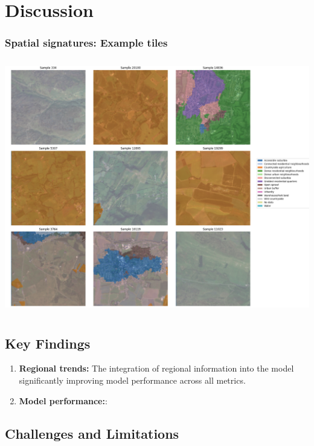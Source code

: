 \documentclass[
  letterpaper,
  DIV=11,
  numbers=noendperiod]{scrartcl}
\begin{document}
\section{Discussion}\label{discussion}

\subsubsection{Spatial signatures: Example
tiles}\label{spatial-signatures-example-tiles}

\begin{center}
\includegraphics[width=\textwidth,height=4.375in]{../figures/algo_design/random_sample.png}
\end{center}

\subsection{Key Findings}\label{key-findings}

\begin{enumerate}
\def\labelenumi{\arabic{enumi}.}
\item
  \textbf{Regional trends:} The integration of regional information into
  the model significantly improving model performance across all
  metrics.
\item
  \textbf{Model performance:}:
\end{enumerate}

\subsection{Challenges and
Limitations}\label{challenges-and-limitations}
\end{document}
